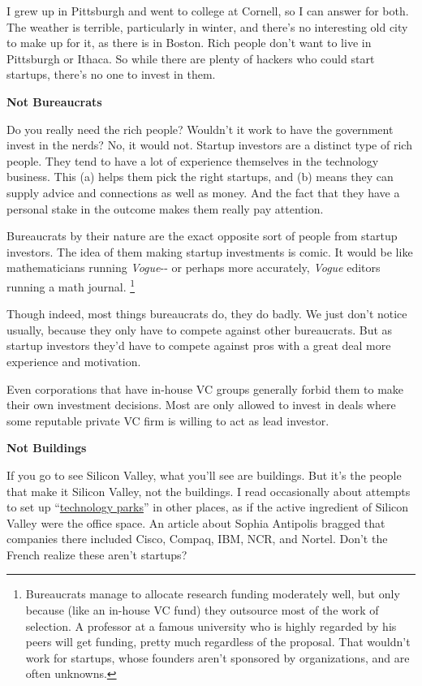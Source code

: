 I grew up in Pittsburgh and went to college at Cornell, so I can answer
for both. The weather is terrible, particularly in winter, and there's
no interesting old city to make up for it, as there is in Boston. Rich
people don't want to live in Pittsburgh or Ithaca. So while there are
plenty of hackers who could start startups, there's no one to invest in
them.

\textbf{Not Bureaucrats}

Do you really need the rich people? Wouldn't it work to have the
government invest in the nerds? No, it would not. Startup investors are
a distinct type of rich people. They tend to have a lot of experience
themselves in the technology business. This (a) helps them pick the
right startups, and (b) means they can supply advice and connections as
well as money. And the fact that they have a personal stake in the
outcome makes them really pay attention.

Bureaucrats by their nature are the exact opposite sort of people from
startup investors. The idea of them making startup investments is comic.
It would be like mathematicians running \emph{Vogue}-\/- or perhaps more
accurately, \emph{Vogue} editors running a math journal.
\footnote{Bureaucrats manage to allocate research funding moderately well,
but only because (like an in-house VC fund) they outsource most of the
work of selection. A professor at a famous university who is highly
regarded by his peers will get funding, pretty much regardless of the
proposal. That wouldn't work for startups, whose founders aren't
sponsored by organizations, and are often unknowns.}

Though indeed, most things bureaucrats do, they do badly. We just don't
notice usually, because they only have to compete against other
bureaucrats. But as startup investors they'd have to compete against
pros with a great deal more experience and motivation.

Even corporations that have in-house VC groups generally forbid them to
make their own investment decisions. Most are only allowed to invest in
deals where some reputable private VC firm is willing to act as lead
investor.

\textbf{Not Buildings}

If you go to see Silicon Valley, what you'll see are buildings. But it's
the people that make it Silicon Valley, not the buildings. I read
occasionally about attempts to set up
``\href{http://www.google.com/search?q=technology+park}{technology
parks}'' in other places, as if the active ingredient of Silicon Valley
were the office space. An article about Sophia Antipolis bragged that
companies there included Cisco, Compaq, IBM, NCR, and Nortel. Don't the
French realize these aren't startups?

